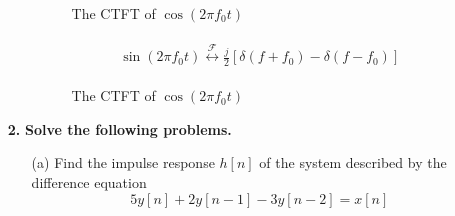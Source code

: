 \documentclass[a4paper, 12pt]{article}
\begin{document}
\begin{itemize}
\begin{itemize}
\begin{figure}[h!]
\caption{The CTFT of $\cos (2 \pi f_{0} t)$}
\end{figure}

\begin{equation}
\begin{gathered}
\begin{alignedat}{1}
\sin(2 \pi f_{0}t) \overset{\mathcal{F}}{\leftrightarrow} \frac{j}{2} \left[ \delta(f + f_{0}) - \delta (f- f_{0})\right]
\end{alignedat}
\end{gathered}
\end{equation}

\begin{figure}[h!]
\caption{The CTFT of $\cos (2 \pi f_{0} t)$}
\end{figure}
\end{itemize}

\item[\textbf{2.}]{\textbf{Solve the following problems.}}
\begin{itemize}
\item[(a)]{Find the impulse response $h[n]$ of the system described by the difference equation}
\begin{equation}
5y[n] + 2y[n-1] - 3y[n-2] = x[n]
\end{equation}


\end{itemize}
\end{itemize}
\end{document}
